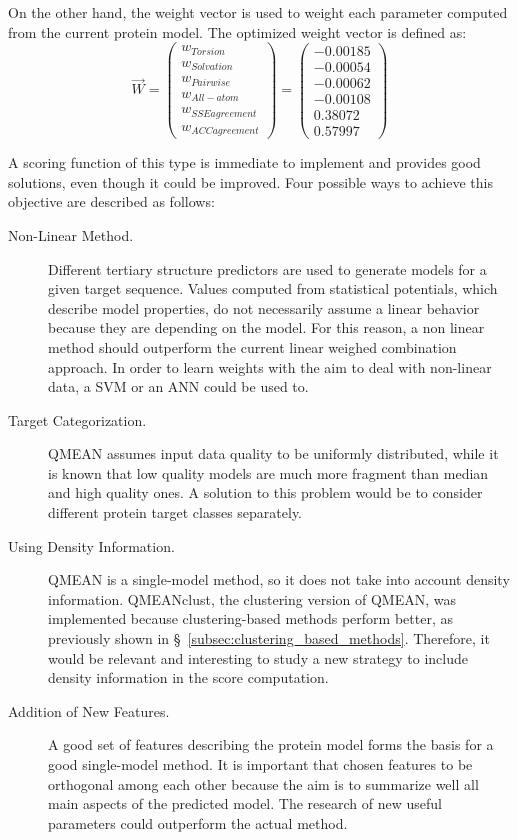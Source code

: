 On the other hand, the weight vector is used to weight each parameter computed from the current protein model. The optimized weight vector is defined as:
\begin{equation}
\vec{W} = 
\left(
\begin{array}{c}
	w_{Torsion}\\
	w_{Solvation}\\
	w_{Pairwise}\\
	w_{All-atom}\\
	w_{SSE agreement}\\
	w_{ACC agreement}
\end{array}
\right) 
=
\left(
\begin{array}{c}
	-0.00185\\
	-0.00054\\
	-0.00062\\
	 -0.00108\\
	0.38072\\
	0.57997
\end{array}
\right)
\end{equation}

A scoring function of this type is immediate to implement and provides good solutions, even though it could be improved. Four possible ways to achieve this objective are described as follows:

\begin{description}
 \item[Non-Linear Method.] Different tertiary structure predictors are used to generate models for a given target sequence. Values computed from statistical potentials, which describe model properties, do not necessarily assume a linear behavior because they are depending on the model. For this reason, a non linear method should outperform the current linear weighed combination approach. In order to learn weights with the aim to deal with non-linear data, a \gls{SVM} or an \gls{ANN} could be used to.
 \item[Target Categorization.] QMEAN assumes input data quality to be uniformly distributed, while it is known that low quality models are much more fragment than median and high quality ones. A solution to this problem would be to consider different protein target classes separately. 
 \item[Using Density Information.] QMEAN is a single-model method, so it does not take into account density information. QMEANclust, the clustering version of QMEAN, was implemented because clustering-based methods perform better, as previously shown in \S~\ref{subsec:clustering_based_methods}. Therefore, it would be relevant and interesting to study a new strategy to include density information in the score computation.
 \item[Addition of New Features.] A good set of features describing the protein model forms the basis for a good single-model method. It is important that chosen features to be orthogonal among each other because the aim is to summarize well all main aspects of the predicted model. The research of new useful parameters could outperform the actual method.
 \end{description} 

